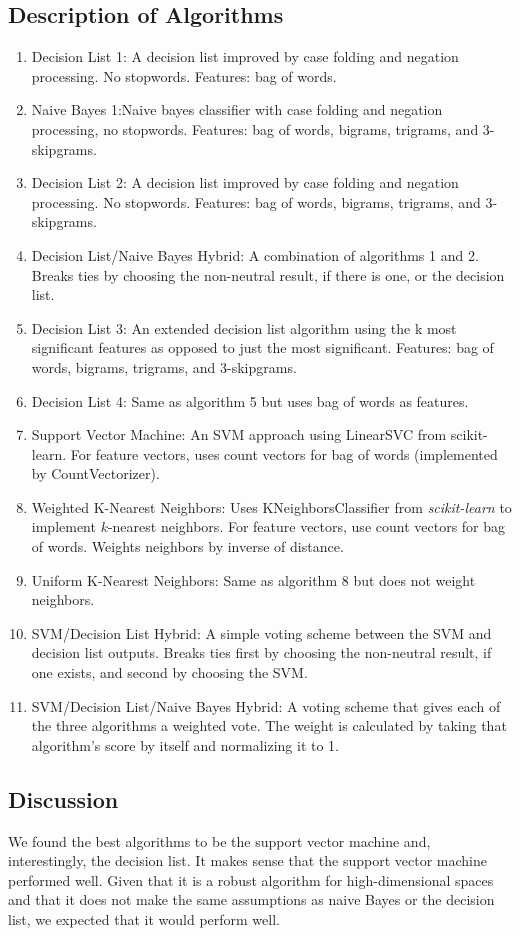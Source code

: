 \documentclass[11pt,letterpaper]{article}
\begin{document}
\subsection{Description of Algorithms}
\begin{enumerate}
\item Decision List 1: A decision list improved by case folding and negation processing. No stopwords. Features: bag of words.
\item Naive Bayes 1:Naive bayes classifier with case folding and negation processing, no stopwords. Features: bag of words, bigrams, trigrams, and 3-skipgrams.
\item Decision List 2: A decision list improved by case folding and negation processing. No stopwords. Features: bag of words, bigrams, trigrams, and 3-skipgrams.
\item Decision List/Naive Bayes Hybrid: A combination of algorithms 1 and 2. Breaks ties by choosing the non-neutral result, if there is one, or the decision list.
\item Decision List 3: An extended decision list algorithm using the k most significant features as opposed to just the most significant. Features: bag of words, bigrams, trigrams, and 3-skipgrams.
\item Decision List 4: Same as algorithm 5 but uses bag of words as features.
\item Support Vector Machine: An SVM approach using LinearSVC from scikit-learn. For feature vectors, uses count vectors for bag of words (implemented by CountVectorizer).
\item Weighted K-Nearest Neighbors: Uses KNeighborsClassifier from \textit{scikit-learn} to implement $k$-nearest neighbors. For feature vectors, use count vectors for bag of words. Weights neighbors by inverse of distance.
\item Uniform K-Nearest Neighbors: Same as algorithm 8 but does not weight neighbors.
\item SVM/Decision List Hybrid: A simple voting scheme between the SVM and decision list outputs. Breaks ties first by choosing the non-neutral result, if one exists, and second by choosing the SVM.
\item SVM/Decision List/Naive Bayes Hybrid: A voting scheme that gives each of the three algorithms a weighted vote. The weight is calculated by taking that algorithm's score by itself and normalizing it to 1.
\end{enumerate}

\subsection{Discussion}
We found the best algorithms to be the support vector machine and, interestingly, the decision list. It makes sense that the support vector machine performed well. Given that it is a robust algorithm for high-dimensional spaces and that it does not make the same assumptions as naive Bayes or the decision list, we expected that it would perform well. 
\end{document}
